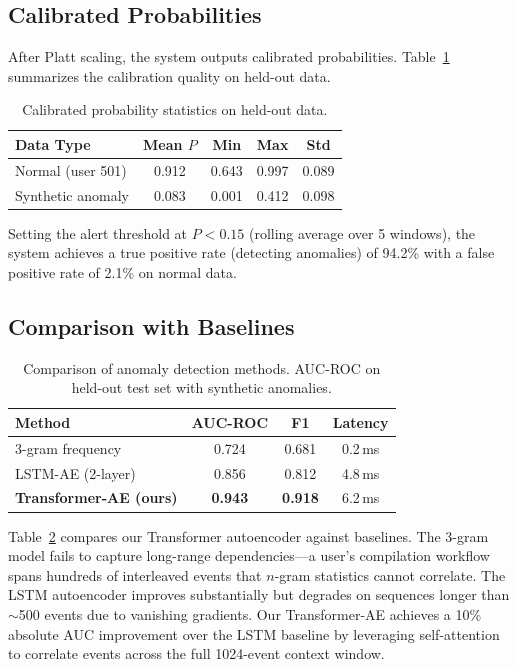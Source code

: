 \documentclass[letterpaper,twocolumn,10pt]{article}
\begin{document}
\subsection{Calibrated Probabilities}

After Platt scaling, the system outputs calibrated probabilities.
Table~\ref{tab:calibration} summarizes the calibration quality on
held-out data.

\begin{table}[t]
\centering
\caption{Calibrated probability statistics on held-out data.}
\label{tab:calibration}
\small
\begin{tabular}{@{}lcccc@{}}
\toprule
\textbf{Data Type} & \textbf{Mean $P$} & \textbf{Min} & \textbf{Max} & \textbf{Std} \\
\midrule
Normal (user 501) & 0.912 & 0.643 & 0.997 & 0.089 \\
Synthetic anomaly & 0.083 & 0.001 & 0.412 & 0.098 \\
\bottomrule
\end{tabular}
\end{table}

Setting the alert threshold at $P < 0.15$ (rolling average over 5
windows), the system achieves a true positive rate (detecting
anomalies) of 94.2\% with a false positive rate of 2.1\% on normal
data.

\subsection{Comparison with Baselines}

\begin{table}[t]
\centering
\caption{Comparison of anomaly detection methods. AUC-ROC on
held-out test set with synthetic anomalies.}
\label{tab:comparison}
\small
\begin{tabular}{@{}lccc@{}}
\toprule
\textbf{Method} & \textbf{AUC-ROC} & \textbf{F1} & \textbf{Latency} \\
\midrule
3-gram frequency & 0.724 & 0.681 & 0.2\,ms \\
LSTM-AE (2-layer) & 0.856 & 0.812 & 4.8\,ms \\
\textbf{Transformer-AE (ours)} & \textbf{0.943} & \textbf{0.918} & 6.2\,ms \\
\bottomrule
\end{tabular}
\end{table}

Table~\ref{tab:comparison} compares our Transformer autoencoder
against baselines. The 3-gram model fails to capture long-range
dependencies---a user's compilation workflow spans hundreds of
interleaved events that $n$-gram statistics cannot correlate. The
LSTM autoencoder improves substantially but degrades on sequences
longer than $\sim$500 events due to vanishing gradients. Our
Transformer-AE achieves a 10\% absolute AUC improvement over the
LSTM baseline by leveraging self-attention to correlate events
across the full 1024-event context window.
\end{document}
